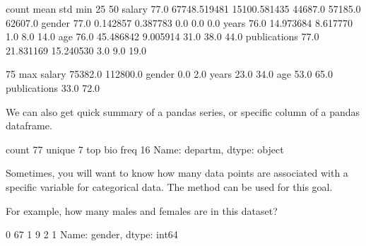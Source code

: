 \documentclass[letterpaper,10pt,english]{sphinxmanual}
\begin{document}
\begin{sphinxVerbatim}[commandchars=\\\{\}]
              count          mean           std      min      25\PYGZpc{}      50\PYGZpc{}  \PYGZbs{}
salary         77.0  67748.519481  15100.581435  44687.0  57185.0  62607.0   
gender         77.0      0.142857      0.387783      0.0      0.0      0.0   
years          76.0     14.973684      8.617770      1.0      8.0     14.0   
age            76.0     45.486842      9.005914     31.0     38.0     44.0   
publications   77.0     21.831169     15.240530      3.0      9.0     19.0   

                  75\PYGZpc{}       max  
salary        75382.0  112800.0  
gender            0.0       2.0  
years            23.0      34.0  
age              53.0      65.0  
publications     33.0      72.0  
\end{sphinxVerbatim}

We can also get quick summary of a pandas series, or specific column of a pandas dataframe.

\begin{sphinxVerbatim}[commandchars=\\\{\}]
\end{sphinxVerbatim}

\begin{sphinxVerbatim}[commandchars=\\\{\}]
count      77
unique      7
top       bio
freq       16
Name: departm, dtype: object
\end{sphinxVerbatim}

Sometimes, you will want to know how many data points are associated with a specific variable for categorical data. The  method can be used for this goal.

For example, how many males and females are in this dataset?

\begin{sphinxVerbatim}[commandchars=\\\{\}]
\PYG{p}{[}\PYG{p}{]}
\end{sphinxVerbatim}

\begin{sphinxVerbatim}[commandchars=\\\{\}]
0    67
1     9
2     1
Name: gender, dtype: int64
\end{sphinxVerbatim}
\end{document}
